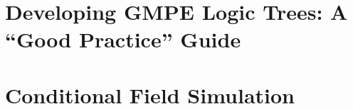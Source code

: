\section{Developing GMPE Logic Trees: A ``Good Practice'' Guide}
\label{sec:logic_tree}

\section{Conditional Field Simulation}
\label{sec:cond_field}